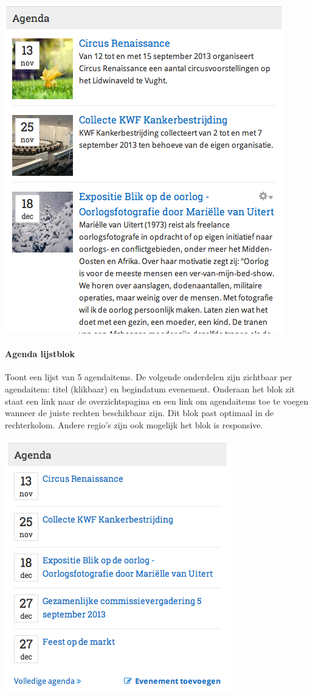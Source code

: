 \begin{center}
	\includegraphics[scale=0.5]{img/blokken/agendateaser.png}
\end{center}

\paragraph{Agenda lijstblok}

Toont een lijst van 5 agendaitems. De volgende onderdelen zijn zichtbaar per agendaitem: titel (klikbaar) en begindatum evenement. Onderaan het blok zit staat een link naar de overzichtspagina en een link om agendaitems toe te voegen wanneer de juiste rechten beschikbaar zijn. Dit blok past optimaal in de rechterkolom. Andere regio's zijn ook mogelijk het blok is responsive.

\begin{center}
	\includegraphics[scale=0.5]{img/blokken/agendalist.png}
\end{center}

